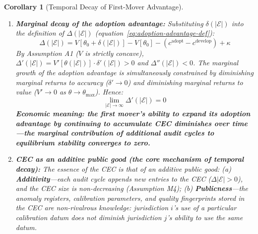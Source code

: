 \documentclass[12pt,a4paper]{article}
\newtheorem{corollary}[theorem]{Corollary}
\theoremstyle{definition}
\theoremstyle{remark}
\begin{document}
\begin{corollary}[Temporal Decay of First-Mover Advantage]
\begin{enumerate}[label=(\roman*), itemsep=6pt]
\item \textbf{Marginal decay of the adoption advantage:} Substituting $\delta(|\mathcal{E}|)$ into the definition of $\Delta(|\mathcal{E}|)$ (equation~\ref{eq:adoption-advantage-def}):
\begin{equation}
\Delta(|\mathcal{E}|) = V[\theta_0 + \delta(|\mathcal{E}|)] - V[\theta_0] - (c^{\text{adopt}} - c^{\text{develop}}) + \kappa
\end{equation}
By Assumption A1 ($V$ is strictly concave), $\Delta'(|\mathcal{E}|) = V'[\theta(|\mathcal{E}|)] \cdot \delta'(|\mathcal{E}|) > 0$ and $\Delta''(|\mathcal{E}|) < 0$. The marginal growth of the adoption advantage is simultaneously constrained by diminishing marginal returns to accuracy ($\delta' \to 0$) and diminishing marginal returns to value ($V' \to 0$ as $\theta \to \theta_{\max}$). Hence:
\begin{equation}
\lim_{|\mathcal{E}| \to \infty} \Delta'(|\mathcal{E}|) = 0
\end{equation}
\textbf{Economic meaning: the first mover's ability to expand its adoption advantage by continuing to accumulate CEC diminishes over time—the marginal contribution of additional audit cycles to equilibrium stability converges to zero.}

\item \textbf{CEC as an additive public good (the core mechanism of temporal decay):} The essence of the CEC is that of an \textit{additive public good}: (a) \textbf{Additivity}—each audit cycle appends new entries to the CEC ($\Delta |\mathcal{E}| > 0$), and the CEC size is non-decreasing (Assumption M4); (b) \textbf{Publicness}—the anomaly registers, calibration parameters, and quality fingerprints stored in the CEC are \textit{non-rivalrous} knowledge: jurisdiction $i$'s use of a particular calibration datum does not diminish jurisdiction $j$'s ability to use the same datum.


\end{enumerate}
\end{corollary}
\end{document}
